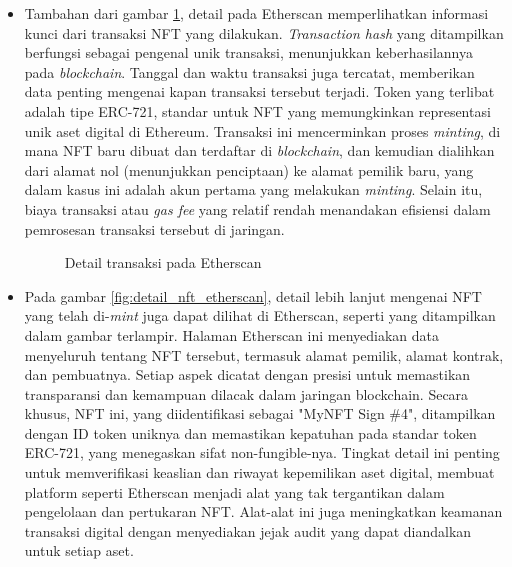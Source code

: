 \begin{itemize}
    \item Tambahan dari gambar \ref*{fig:detail_transaksi_etherscan}, detail pada Etherscan memperlihatkan informasi kunci dari transaksi NFT yang dilakukan. \emph{Transaction hash} yang ditampilkan berfungsi sebagai pengenal unik transaksi, menunjukkan keberhasilannya pada \emph{blockchain}. Tanggal dan waktu transaksi juga tercatat, memberikan data penting mengenai kapan transaksi tersebut terjadi. Token yang terlibat adalah tipe ERC-721, standar untuk NFT yang memungkinkan representasi unik aset digital di Ethereum. Transaksi ini mencerminkan proses \emph{minting}, di mana NFT baru dibuat dan terdaftar di \emph{blockchain}, dan kemudian dialihkan dari alamat nol (menunjukkan penciptaan) ke alamat pemilik baru, yang dalam kasus ini adalah akun pertama yang melakukan \emph{minting}. Selain itu, biaya transaksi atau \emph{gas fee} yang relatif rendah menandakan efisiensi dalam pemrosesan transaksi tersebut di jaringan.

    \begin{figure} [H] \centering
    \caption{Detail transaksi pada Etherscan}
    \label{fig:detail_transaksi_etherscan}
    \end{figure}

    \item Pada gambar \ref*{fig:detail_nft_etherscan}, detail lebih lanjut mengenai NFT yang telah di-\emph{mint} juga dapat dilihat di Etherscan, seperti yang ditampilkan dalam gambar terlampir. Halaman Etherscan ini menyediakan data menyeluruh tentang NFT tersebut, termasuk alamat pemilik, alamat kontrak, dan pembuatnya. Setiap aspek dicatat dengan presisi untuk memastikan transparansi dan kemampuan dilacak dalam jaringan blockchain. Secara khusus, NFT ini, yang diidentifikasi sebagai "MyNFT Sign \#4", ditampilkan dengan ID token uniknya dan memastikan kepatuhan pada standar token ERC-721, yang menegaskan sifat non-fungible-nya. Tingkat detail ini penting untuk memverifikasi keaslian dan riwayat kepemilikan aset digital, membuat platform seperti Etherscan menjadi alat yang tak tergantikan dalam pengelolaan dan pertukaran NFT. Alat-alat ini juga meningkatkan keamanan transaksi digital dengan menyediakan jejak audit yang dapat diandalkan untuk setiap aset.


\end{itemize}
